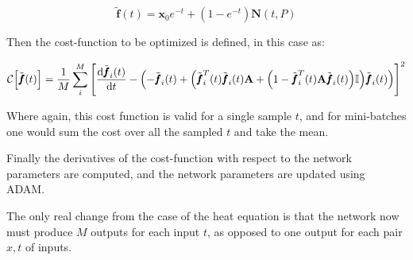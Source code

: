 \documentclass[reprint, english, nofootinbib]{revtex4-2}
\begin{document}
\begin{equation}
    \tilde{\pmb f}(t) = \pmb x_0 e^{-t} + (1 - e^{-t}) \pmb N(t, P)
\end{equation}

Then the cost-function to be optimized is defined, in this case as:

\begin{widetext}
\begin{equation}
    \mathcal C\qty[\tilde{\pmb f}(t)] = \frac{1}{M}\sum_{i}^M \qty[ 
    \dv{\tilde{\pmb f}_i(t)}{t} - \qty(- \tilde{\pmb f}_i(t) + \qty(\tilde{\pmb f}_i^T(t)\tilde{\pmb f}_i(t) \mathbf{A} + 
    \qty(1 - \tilde{\pmb f}^T_i(t) \mathbf{A} \tilde{\pmb f}_i(t)) \mathbb I) \tilde{\pmb f}_i(t))]^2
\end{equation}
\end{widetext}
Where again, this cost function is valid for a single sample $t$, and for mini-batches one would sum the cost over all the sampled $t$ and take the mean.

Finally the derivatives of the cost-function with respect to the network parameters are computed, and the network parameters are updated using ADAM.

The only real change from the case of the heat equation is that the network now must produce $M$ outputs for each input $t$, as opposed to one output for each pair $x,t$ of inputs.
\end{document}
